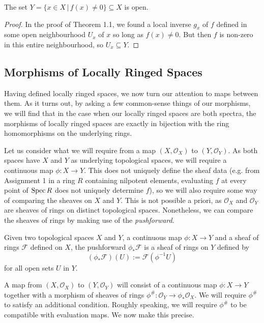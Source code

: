\begin{theorem}
The set $Y = \{x \in X \, | \, f(x) \ne 0\} \subseteq X$ is open.
\end{theorem}

\begin{proof}
In the proof of Theorem 1.1, we found a local inverse $g_x$ of $f$ defined in some open neighbourhood $U_x$ of $x$ so long as $f(x) \ne 0$. But then $f$ is non-zero in this entire neighbourhood, so $U_x \subseteq Y$.
\end{proof}

\subsection{Morphisms of Locally Ringed Spaces}

Having defined locally ringed spaces, we now turn our attention to maps between them. As it turns out, by asking a few common-sense things of our morphisms, we will find that in the case when our locally ringed spaces are both spectra, the morphisms of locally ringed spaces are exactly in bijection with the ring homomorphisms on the underlying rings.

Let us consider what we will require from a map $(X,\mathcal{O}_X)$ to $(Y,\mathcal{O}_Y)$.
As both spaces have $X$ and $Y$ as underlying topological spaces, we will require a continuous map $\phi : X \to Y$. This does not uniquely define the sheaf data (e.g. from Assignment 1 in a ring $R$ containing nilpotent elements, evaluating $f$ at every point of $\operatorname{Spec} R$ does not uniquely determine $f$), so we will also require some way of comparing the sheaves on $X$ and $Y$. This is not possible a priori, as $\mathcal{O}_X$ and $\mathcal{O}_Y$ are sheaves of rings on distinct topological spaces. Nonetheless, we can compare the sheaves of rings by making use of the \textit{pushforward}. 

\begin{definition}
Given two topological spaces $X$ and $Y$, a continuous map {$\phi : X \to Y$} and a sheaf of rings $\mathcal{F}$ defined on $X$, the pushforward $\phi_\ast\mathcal{F}$ is a sheaf of rings on $Y$ defined by
\begin{equation}
(\phi_\ast\mathcal{F})(U) 	:= 	\mathcal{F}(\phi^{-1}U)
\end{equation}
for all open sets $U$ in $Y$.
\end{definition}

A map from \((X, \mathcal{O}_X)\) to \((Y, \mathcal{O}_Y)\) will consist of a continuous map \(\phi \colon X \to Y\) together with a morphism of sheaves of rings $\phi^\# : \mathcal{O}_Y \to \phi_\ast\mathcal{O}_X$.
We will require \(\phi^{\#}\) to satisfy an additional condition.
Roughly speaking, we will require \(\phi^{\#}\) to be compatible with evaluation maps.
We now make this precise.

